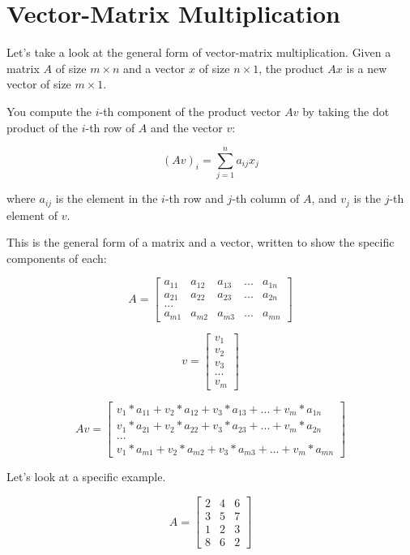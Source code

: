 \section{Vector-Matrix Multiplication}
Let's take a look at the general form of vector-matrix multiplication. Given a matrix $A$ of size $m \times n$ and a vector $x$ of size $n \times 1$, the product $Ax$ is a new vector of size $m \times 1$. 

You compute the $i$-th component of the product vector $Av$ by taking the dot product of the $i$-th row of $A$ and the vector $v$:

\begin{equation*}
(Av)_i = \sum_{j=1}^n a_{ij}x_j
\end{equation*}

where $a_{ij}$ is the element in the $i$-th row and $j$-th column of $A$, and $v_j$ is the $j$-th element of $v$.

This is the general form of a matrix and a vector, written to show the specific components of each:


 $$A = \begin{bmatrix}
 a_{11} &a_{12}  &a_{13} &... &a_{1n}  \\
 a_{21} &a_{22}  &a_{23} &... &a_{2n}  \\
 ... \\
 a_{m1} &a_{m2}  &a_{m3} &... &a_{mn}  
\end{bmatrix}$$

$$v = \begin{bmatrix}
 v_{1}  \\
 v_{2} \\
 v_{3} \\
 ... \\
 v_{m} 
\end{bmatrix}$$

 $$Av =\begin{bmatrix}
 v_{1}*a_{11} +v_{2}*a_{12}  +v_{3}*a_{13} +... +v_{m}*a_{1n}  \\
 v_{1}*a_{21} +v_{2}*a_{22}  +v_{3}*a_{23} +... +v_{m}*a_{2n}  \\
 ... \\
 v_{1}*a_{m1} +v_{2}*a_{m2}  +v_{3}*a_{m3} +... +v_{m}*a_{mn}  
\end{bmatrix}$$

Let's look at a specific example.

$$A = \begin{bmatrix}
 2  &4 &6  \\
 3  &5 &7  \\
 1  &2 &3  \\
 8  &6 &2 
\end{bmatrix}$$

